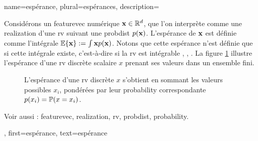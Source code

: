 {name={espérance}, plural={espérances},
	description={Considérons un \gls{featurevec} numérique ${\bf x} \in \mathbb{R}^{d}$, 
		que l’on interprète comme une \gls{realization} d’une \gls{rv} suivant une \gls{probdist} $p({\bf x})$. 
		L’espérance de ${\bf x}$ est définie comme l’intégrale $\mathbb{E} \{ {\bf x} \} := \int {\bf x} p({\bf x})$. 
		Notons que cette espérance n’est définie que si cette intégrale existe, c’est-à-dire si la \gls{rv} est intégrable 
		\cite{RudinBookPrinciplesMatheAnalysis}, \cite{BillingsleyProbMeasure}, \cite{HalmosMeasure}. 
		La figure \ref{fig_expect_discrete_dict} illustre l’espérance d’une \gls{rv} discrète scalaire $x$ prenant ses valeurs 
		dans un ensemble fini.
		\begin{figure}[H]
			\begin{center}
			\end{center}
			\vspace*{-5mm}
			\caption{L’espérance d’une \gls{rv} discrète $x$ s’obtient en sommant les valeurs possibles $x_{i}$, pondérées par 
				leur \gls{probability} correspondante $p(x_i) = \mathbb{P}({x= x_i})$. \label{fig_expect_discrete_dict}}
		\end{figure}
		Voir aussi : \gls{featurevec}, \gls{realization}, \gls{rv}, \gls{probdist}, \gls{probability}.},
	first={espérance},
	text={espérance}
}


